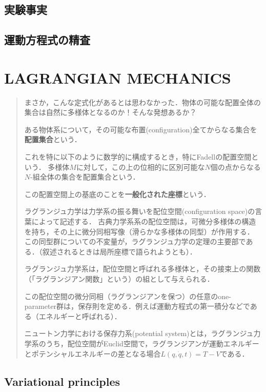 \documentclass[uplatex, 12pt, dvipdfmx]{jsreport}
\begin{document}
\chapter{実験事実}

\chapter{運動方程式の精査}

\part{LAGRANGIAN MECHANICS}

\begin{abstract}
    まさか，こんな定式化があるとは思わなかった．物体の可能な配置全体の集合は自然に多様体となるのか！そんな発想あるか？
    \begin{definition}
        ある物体系について，その可能な布置(configuration)全てからなる集合を\textbf{配置集合}という．

        これを特に以下のように数学的に構成するとき，特にFadellの配置空間という．
        多様体$M$に対して，この上の位相的に区別可能な$N$個の点からなる$N$-組全体の集合を配置集合という．

        この配置空間上の基底のことを\textbf{一般化された座標}という．
    \end{definition}
    ラグランジュ力学は力学系の振る舞いを配位空間(configuration space)の言葉によって記述する．
    古典力学系系の配位空間は，可微分多様体の構造を持ち，その上に微分同相写像（滑らかな多様体の同型）が作用する．
    この同型群についての不変量が，ラグランジュ力学の定理の主要部である．（叙述されるときは局所座標で語られようとも）．

    ラグランジュ力学系は，配位空間と呼ばれる多様体と，その接束上の関数（「ラグランジアン関数」という）の組として与えられる．

    この配位空間の微分同相（ラグランジアンを保つ）の任意のone-parameter群は，保存則を定める．例えば運動方程式の第一積分などである（エネルギーと呼ばれる）．

    ニュートン力学における保存力系(potential system)とは，ラグランジュ力学系のうち，配位空間がEuclid空間で，ラグランジアンが運動エネルギーとポテンシャルエネルギーの差となる場合$L(q,\dot{q},t)=T-V$である．
\end{abstract}

\chapter{Variational principles}
\end{document}
